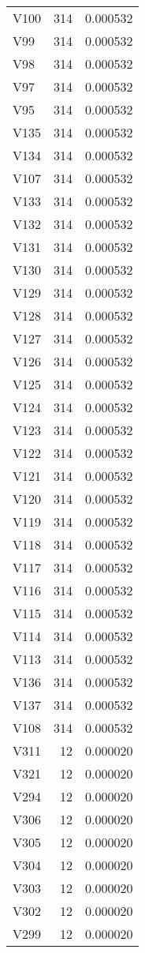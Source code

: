 \begin{tabular}{lrr}
V100 & 314 & 0.000532 \\
V99 & 314 & 0.000532 \\
V98 & 314 & 0.000532 \\
V97 & 314 & 0.000532 \\
V95 & 314 & 0.000532 \\
V135 & 314 & 0.000532 \\
V134 & 314 & 0.000532 \\
V107 & 314 & 0.000532 \\
V133 & 314 & 0.000532 \\
V132 & 314 & 0.000532 \\
V131 & 314 & 0.000532 \\
V130 & 314 & 0.000532 \\
V129 & 314 & 0.000532 \\
V128 & 314 & 0.000532 \\
V127 & 314 & 0.000532 \\
V126 & 314 & 0.000532 \\
V125 & 314 & 0.000532 \\
V124 & 314 & 0.000532 \\
V123 & 314 & 0.000532 \\
V122 & 314 & 0.000532 \\
V121 & 314 & 0.000532 \\
V120 & 314 & 0.000532 \\
V119 & 314 & 0.000532 \\
V118 & 314 & 0.000532 \\
V117 & 314 & 0.000532 \\
V116 & 314 & 0.000532 \\
V115 & 314 & 0.000532 \\
V114 & 314 & 0.000532 \\
V113 & 314 & 0.000532 \\
V136 & 314 & 0.000532 \\
V137 & 314 & 0.000532 \\
V108 & 314 & 0.000532 \\
V311 & 12 & 0.000020 \\
V321 & 12 & 0.000020 \\
V294 & 12 & 0.000020 \\
V306 & 12 & 0.000020 \\
V305 & 12 & 0.000020 \\
V304 & 12 & 0.000020 \\
V303 & 12 & 0.000020 \\
V302 & 12 & 0.000020 \\
V299 & 12 & 0.000020 \\

\end{tabular}
